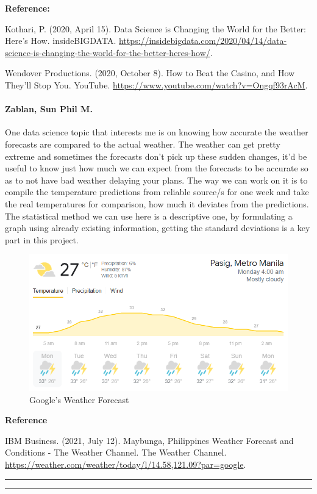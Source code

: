 \documentclass[
]{article}
\begin{document}
\textbf{Reference:}

Kothari, P. (2020, April 15). Data Science is Changing the World for the
Better: Here's How. insideBIGDATA.
\url{https://insidebigdata.com/2020/04/14/data-science-is-changing-the-world-for-the-better-heres-how/}.

Wendover Productions. (2020, October 8). How to Beat the Casino, and How
They'll Stop You. YouTube.
\url{https://www.youtube.com/watch?v=Ongqf93rAcM}.

\hypertarget{zablan-sun-phil-m.}{%
\paragraph{Zablan, Sun Phil M.}\label{zablan-sun-phil-m.}}

One data science topic that interests me is on knowing how accurate the
weather forecasts are compared to the actual weather. The weather can
get pretty extreme and sometimes the forecasts don't pick up these
sudden changes, it'd be useful to know just how much we can expect from
the forecasts to be accurate so as to not have bad weather delaying your
plans. The way we can work on it is to compile the temperature
predictions from reliable source/s for one week and take the real
temperatures for comparison, how much it deviates from the predictions.
The statistical method we can use here is a descriptive one, by
formulating a graph using already existing information, getting the
standard deviations is a key part in this project.

\begin{figure}
\centering
\includegraphics{./del.png}
\caption{Google's Weather Forecast}
\end{figure}

\textbf{Reference}

IBM Business. (2021, July 12). Maybunga, Philippines Weather Forecast
and Conditions - The Weather Channel. The Weather Channel.
\url{https://weather.com/weather/today/l/14.58,121.09?par=google}.

\begin{center}\rule{0.5\linewidth}{0.5pt}\end{center}

\begin{center}\rule{0.5\linewidth}{0.5pt}\end{center}
\end{document}
